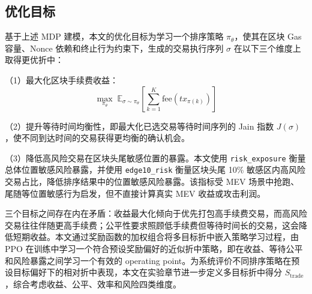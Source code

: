 \subsection{优化目标}

基于上述 MDP 建模，本文的优化目标为学习一个排序策略 $\pi_\theta$，使其在区块 Gas 容量、Nonce 依赖和终止行为约束下，生成的交易执行序列 $\sigma$ 在以下三个维度上取得更优折中：

（1）最大化区块手续费收益：
\begin{equation}
  \max_{\pi_\theta} \; \mathbb{E}_{\sigma \sim \pi_\theta} \left[ \sum_{k=1}^{K} \text{fee}(tx_{\pi(k)}) \right]
\end{equation}

（2）提升等待时间均衡性，即最大化已选交易等待时间序列的 Jain 指数 $J(\sigma)$，使不同到达时间的交易获得更均衡的确认机会。

（3）降低高风险交易在区块头尾敏感位置的暴露。本文使用 \texttt{risk\_exposure} 衡量总体位置敏感风险暴露，并使用 \texttt{edge10\_risk} 衡量区块头尾 10\% 敏感区内高风险交易占比，降低排序结果中的位置敏感风险暴露。该指标受 MEV 场景中抢跑、尾随等位置敏感行为启发，但不直接计算真实 MEV 收益或攻击利润。

三个目标之间存在内在矛盾：收益最大化倾向于优先打包高手续费交易，而高风险交易往往伴随更高手续费；公平性要求照顾低手续费但等待时间长的交易，这会降低短期收益。本文通过奖励函数的加权组合将多目标折中嵌入策略学习过程，由 PPO 在训练中学习一个符合预设奖励偏好的近似折中策略，即在收益、等待公平和风险暴露之间学习一个有效的 operating point。为系统评价不同排序策略在预设目标偏好下的相对折中表现，本文在实验章节进一步定义多目标折中得分 $S_{\text{trade}}$，综合考虑收益、公平、效率和风险四类维度。

